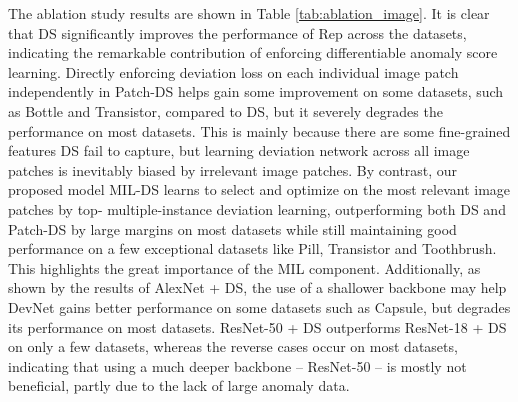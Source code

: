 \documentclass[10pt,journal,compsoc]{IEEEtran}
\begin{document}
The ablation study results are shown in Table \ref{tab:ablation_image}. It is clear that DS significantly improves the performance of Rep across the datasets, indicating the remarkable contribution of enforcing differentiable anomaly score learning. Directly enforcing deviation loss on each individual image patch independently in Patch-DS helps gain some improvement on some datasets, such as Bottle and Transistor, compared to DS, but it severely degrades the performance on most datasets. This is mainly because there are some fine-grained features DS fail to capture, but learning deviation network across all image patches is inevitably biased by irrelevant image patches. By contrast, our proposed model MIL-DS learns to select and optimize on the most relevant image patches by top- multiple-instance deviation learning, outperforming both DS and Patch-DS by large margins on most datasets while still maintaining good performance on a few exceptional datasets like Pill, Transistor and Toothbrush. This highlights the great importance of the MIL component. Additionally, as shown by the results of AlexNet + DS, the use of a shallower backbone may help DevNet gains better performance on some datasets such as Capsule, but degrades its performance on most datasets. ResNet-50 + DS outperforms ResNet-18 + DS on only a few datasets, whereas the reverse cases occur on most datasets, indicating that using a much deeper backbone -- ResNet-50 -- is mostly not beneficial, partly due to the lack of large anomaly data. 
\end{document}
